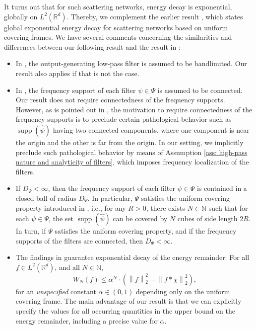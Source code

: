 \documentclass[11pt]{amsart}
\newcommand{\R}{{\mathbb{R}}}
\newcommand{\N}{\mathbb{N}}
\newcommand{\norm}[1]{\ensuremath{\left\lVert\text{}#1\text{}\right\rVert}}
\DeclareMathOperator{\supp}{supp}
\newenvironment{proof sketch} {\textit{Proof sketch.}}{}
\begin{document}
  It turns out that for such scattering networks, energy decay is exponential, globally on $L^2(\R^d)$. Thereby, we complement the earlier result \cite[Proposition 3.3]{czaja2019analysis}, which states global exponential energy decay for scattering networks based on uniform covering frames. We have several comments concerning the similarities and differences between our following result and the result in \cite{czaja2019analysis}:
  \begin{itemize}
    \item In \cite{czaja2019analysis}, the output-generating low-pass filter is assumed to be bandlimited. Our result also applies if that is not the case.
    \item In \cite{czaja2019analysis}, the frequency support of each filter $\psi \in \Psi$ is assumed to be connected. Our result does not require connectedness of the frequency supports. However, as is pointed out in \cite[Remark 2.2]{czaja2019analysis}, the motivation to require connectedness of the frequency supports is to preclude certain pathological behavior such as $\supp(\widehat{\psi})$ having two connected components, where one component is near the origin and the other is far from the origin. In our setting, we implicitly preclude such pathological behavior by means of Assumption \ref{ass: high-pass nature and analyticity of filters}, which imposes frequency localization of the filters.
    \item If $D_\Psi<\infty$, then the frequency support of each filter $\psi \in \Psi$ is contained in a closed ball of radius $D_\Psi$. In particular, $\Psi$ satisfies the uniform covering property introduced in \cite{czaja2019analysis}, i.e., for any $R>0$, there exists $N \in \N$ such that for each $\psi \in \Psi$, the set $\supp(\widehat{\psi})$ can be covered by $N$ cubes of side length $2R$. In turn, if $\Psi$ satisfies the uniform covering property, and if the frequency supports of the filters are connected, then $D_\Psi<\infty$.
    \item The findings in \cite[Proposition 3.3]{czaja2019analysis} guarantee exponential decay of the energy remainder: For all $f \in L^2(\R^d)$, and all $N \in \N$,
    \[W_N(f)\leq \alpha^{N}\cdot \left(\norm{f}_{2}^2-\norm{f*\chi}_2^2\right),\]
    for an \textit{unspecified} constant $\alpha \in (0,1)$ depending only on the uniform covering frame. The main advantage of our result is that we can explicitly specify the values for all occurring quantities in the upper bound on the energy remainder, including a precise value for $\alpha$.
  \end{itemize}
  
\end{document}
